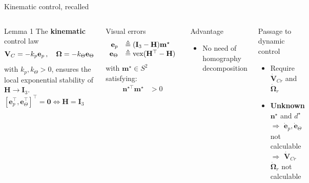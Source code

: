 \documentclass{beamer}
\begin{document}
\begin{frame}{Kinematic control, recalled}
\begin{columns}
\begin{block}{Lemma 1}
			The \textbf{kinematic} control law
			\vspace{-0.2cm}			
			\begin{equation*}\label{maliscontrol}
			\mathbf{V}_{C} = -k_p \mathbf{e}_p\,,\quad \mathbf{\Omega} = -k_\Theta \mathbf{e}_\Theta 
			\vspace{-0.2cm} 
			\end{equation*}
			with $k_p, k_\Theta>0$, 
			ensures the local exponential stability of $\mathbf{H}  \rightarrow \mathbf{I}_3$. 
			\\
			\vspace{0.3cm}
			\centering
			$[\mathbf{e}_p^\top, \mathbf{e}_\Theta^\top]^\top = \mathbf{0} \Leftrightarrow \mathbf{H} = \mathbf{I}_3$ 
		\end{block}
		\vspace{-0.5cm}
		\begin{block}{Visual errors}
			\vspace{-0.5cm}
			\[
			\begin{array}{rl}
			\mathbf{e}_p &\triangleq (\mathbf{I}_3 - \mathbf{H})\mathbf{m}^\star\\
			\mathbf{e}_\Theta &\triangleq \mathrm{vex}(\mathbf{H}^\top - \mathbf{H}) 
			\end{array}	\vspace{-0.3cm}	
			\]
			\centering
			with $\mathbf{m}^\star \in S^2$ satisfying: \vspace{-0.4cm}
			\[
			\begin{array}{ll} 
			\mathbf{n}^{\star \top} \mathbf{m}^\star &> 0
			\end{array}
			\]		
		\end{block}\vspace{-0.2cm}
		\pause
		\begin{block}{Advantage}
			\begin{itemize}
				\item No need of homography decomposition				
			\end{itemize}
		\end{block}\vspace{-0.2cm}
		\pause
		\begin{exampleblock}{\small Passage to dynamic control} 
			\begin{itemize}
				\item Require $\dot{\mathbf{V}}_{Cr} $ and $\dot{\mathbf{\Omega}}_{r} $ 
				\item \textbf{Unknown} $\mathbf{n}^{\star}$ and $d^\star$ \\
				$\Rightarrow$ {\color{red} $\dot{\mathbf{e}}_p, \dot{\mathbf{e}}_\Theta$ not calculable}\\	
				$\!\!\!\!\!\!\!\Rightarrow$ $\dot{\mathbf{V}}_{Cr} $  $\dot{\mathbf{\Omega}}_{r}$ not calculable			
			\end{itemize}
		\end{exampleblock}
	\end{columns}
\end{frame}
\end{document}
